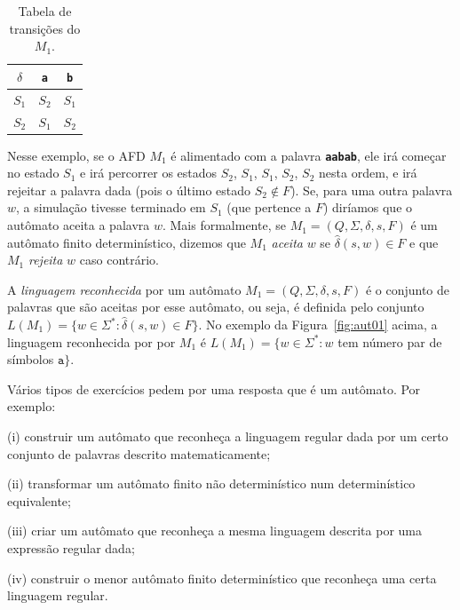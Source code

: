 \documentclass[
	12pt,				%
	openany,
	oneside,
	a4paper,			%
	english,			%
	brazil,				%
	]{abntex2}
\begin{document}
\begin{table}[H]
	\centering
	\begin{tabular}[H]{c|c c}
		$\delta$ & \textbf{\texttt{a}} & \textbf{\texttt{b}} \\
		\hline
		$S_1$    & $S_2$               & $S_1$               \\
		$S_2$    & $S_1$               & $S_2$
	\end{tabular}
	\caption{Tabela de transições do $M_1$.}
	\label{tab:tabTransicoesM1}
	\vspace{-0.5cm}
\end{table}


Nesse exemplo, se o AFD $M_1$ é alimentado com a palavra \textbf{\texttt{aabab}}, ele irá começar no estado $S_1$ e irá percorrer os estados $S_2$, $S_1$, $S_1$, $S_2$, $S_2$ nesta ordem, e irá rejeitar a palavra dada (pois o último estado $S_2 \not\in F$). Se, para uma outra palavra $w$, a simulação tivesse terminado em $S_1$ (que pertence a $F$) diríamos que o autômato aceita a palavra $w$. Mais formalmente, se $M_1 = (Q, \Sigma, \delta, s, F)$ é um autômato finito determinístico, dizemos que $M_1$ \emph{aceita} $w$ se $\hat{\delta}(s, w) \in F$ e que $M_1$ \emph{rejeita} $w$ caso contrário.

A \emph{linguagem reconhecida} por um autômato $M_1 = (Q, \Sigma, \delta, s, F)$ é o conjunto de palavras que são aceitas por esse autômato, ou seja, é definida pelo conjunto $ L(M_1) = \{w \in \Sigma^* \colon \hat{\delta}(s, w) \in F \}$. No exemplo da Figura~\ref{fig:aut01} acima, a linguagem reconhecida por por $M_1$ é $L(M_1) = \{w \in \Sigma^* :  w$  tem número par de símbolos $\mathtt{a}\}$.

\bigskip

Vários tipos de exercícios pedem por uma resposta que é um autômato. Por exemplo:
\begin{alineas}%
	\item[(i)] construir um autômato que reconheça a linguagem regular
	dada por um certo conjunto de palavras descrito matematicamente;
	\item[(ii)] transformar um autômato finito não determinístico num
	determinístico equivalente;
	\item[(iii)] criar um autômato que reconheça a mesma linguagem
	descrita por uma expressão regular dada;
	\item[(iv)] construir o menor autômato finito determinístico
	que reconheça uma certa linguagem regular.
\end{alineas}
\end{document}
